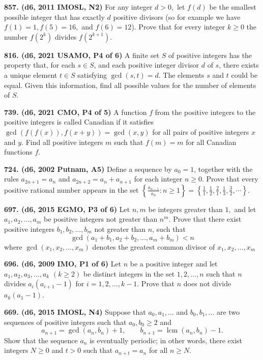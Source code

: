 \documentclass{article}
\begin{document}
\textbf{857. (\color{red}d6\color{black}, 2011 IMOSL, N2)} For any integer $d > 0,$ let $f(d)$ be the smallest possible integer that has exactly $d$ positive divisors (so for example we have $f(1)=1, f(5)=16,$ and $f(6)=12$). Prove that for every integer $k \geq 0$ the number $f\left(2^k\right)$ divides $f\left(2^{k+1}\right).$


\textbf{816. (\color{red}d6\color{black}, 2021 USAMO, P4 of 6)} A finite set $S$ of positive integers has the property that, for each $s \in S$, and each positive integer divisor $d$ of $s$, there exists a unique element $t \in S$ satisfying $\operatorname{gcd}(s, t)=d$. The elements $s$ and $t$ could be equal.
Given this information, find all possible values for the number of elements of $S$.

\textbf{739. (\color{red}d6\color{black}, 2021 CMO, P4 of 5)} A function $f$ from the positive integers to the positive integers is called Canadian if it satisfies
$\gcd(f(f(x)), f(x+y))=\gcd(x, y)$
for all pairs of positive integers $x$ and $y$.
Find all positive integers $m$ such that $f(m)=m$ for all Canadian functions $f$.

\textbf{724. (\color{red}d6\color{black}, 2002 Putnam, A5)} Define a sequence by $a_0=1$, together with the rules $a_{2n+1}=a_n$ and $a_{2n+2}=a_n+a_{n+1}$ for each integer $n\ge0$. Prove that every positive rational number appears in the set $ \left\{ \tfrac {a_{n-1}}{a_n}: n \ge 1 \right\} = \left\{ \tfrac {1}{1}, \tfrac {1}{2}, \tfrac {2}{1}, \tfrac {1}{3}, \tfrac {3}{2}, \cdots \right\} $.

\textbf{697. (\color{red}d6\color{black}, 2015 EGMO, P3 of 6)} Let $n, m$ be integers greater than $1,$ and let $a_{1}, a_{2}, \ldots, a_{m}$ be positive integers not greater than $n^{m}$. Prove that there exist positive integers $b_{1}, b_{2}, \ldots, b_{m}$ not greater than $n$, such that
$$
    \gcd\left(a_{1}+b_{1}, a_{2}+b_{2}, \ldots, a_{m}+b_{m}\right)<n
$$
where $\gcd\left(x_{1}, x_{2}, \ldots, x_{m}\right)$ denotes the greatest common divisor of $x_{1}, x_{2}, \ldots, x_{m}$

\textbf{696. (\color{red}d6\color{black}, 2009 IMO, P1 of 6)} Let $n$ be a positive integer and let $a_{1}, a_{2}, a_{3}, \ldots, a_{k}$ $(k \geq 2)$ be distinct integers in the set $1,2, \ldots, n$ such that $n$ divides $a_{i}\left(a_{i+1}-1\right)$ for $i=1,2, \ldots, k-1$. Prove that $n$ does not divide $a_{k}\left(a_{1}-1\right)$.

\textbf{669. (\color{red}d6\color{black}, 2015 IMOSL, N4)} Suppose that $a_0, a_1, \dots $ and $b_0, b_1, \dots$ are two sequences of positive integers such that $a_0, b_0 \ge 2$ and \[ a_{n+1} = \gcd{(a_n, b_n)} + 1, \qquad b_{n+1} = \operatorname{lcm}{(a_n, b_n)} - 1. \] Show that the sequence $a_n$ is eventually periodic; in other words, there exist integers $N \ge 0$ and $t > 0$ such that $a_{n+t} = a_n$ for all $n \ge N$.
\end{document}
